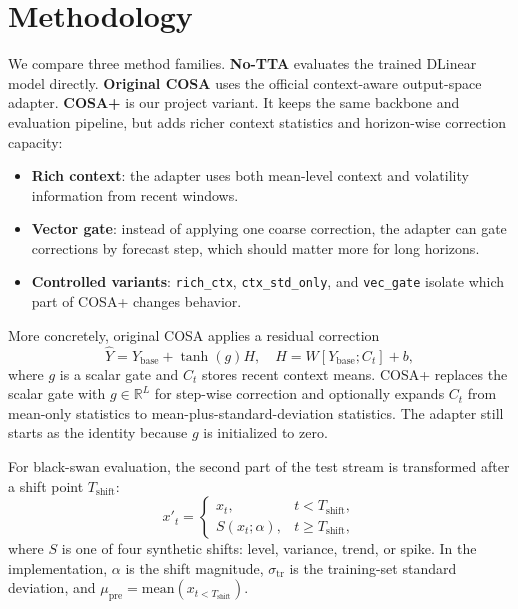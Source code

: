 \documentclass[10pt]{article}
\begin{document}
\section{Methodology}
We compare three method families. \textbf{No-TTA} evaluates the trained DLinear model directly. \textbf{Original COSA} uses the official context-aware output-space adapter. \textbf{COSA+} is our project variant. It keeps the same backbone and evaluation pipeline, but adds richer context statistics and horizon-wise correction capacity:
\begin{itemize}
  \item \textbf{Rich context}: the adapter uses both mean-level context and volatility information from recent windows.
  \item \textbf{Vector gate}: instead of applying one coarse correction, the adapter can gate corrections by forecast step, which should matter more for long horizons.
  \item \textbf{Controlled variants}: \texttt{rich\_ctx}, \texttt{ctx\_std\_only}, and \texttt{vec\_gate} isolate which part of COSA+ changes behavior.
\end{itemize}

More concretely, original COSA applies a residual correction
\begin{equation}
  \hat{Y} = Y_{\text{base}} + \tanh(g)H,\quad
  H = W[Y_{\text{base}}; C_t] + b,
\end{equation}
where $g$ is a scalar gate and $C_t$ stores recent context means. COSA+ replaces the scalar gate with $g\in\mathbb{R}^{L}$ for step-wise correction and optionally expands $C_t$ from mean-only statistics to mean-plus-standard-deviation statistics. The adapter still starts as the identity because $g$ is initialized to zero.

For black-swan evaluation, the second part of the test stream is transformed after a shift point $T_{\text{shift}}$:
\begin{equation}
  x'_t =
  \begin{cases}
    x_t, & t < T_{\text{shift}}, \\
    S(x_t; \alpha), & t \ge T_{\text{shift}},
  \end{cases}
\end{equation}
where $S$ is one of four synthetic shifts: level, variance, trend, or spike. In the implementation, $\alpha$ is the shift magnitude, $\sigma_{\mathrm{tr}}$ is the training-set standard deviation, and $\mu_{\mathrm{pre}}=\mathrm{mean}(x_{t<T_{\text{shift}}})$.
\end{document}
